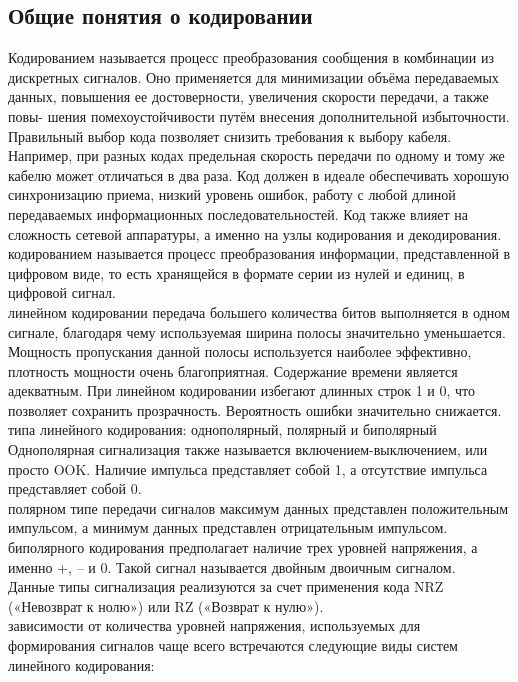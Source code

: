 \documentclass[a4paper14pt]{article}
\begin{document}
\subsection{Общие понятия о кодировании}
Кодированием называется процесс преобразования сообщения в комбинации из дискретных сигналов. Оно применяется для минимизации объёма передаваемых данных, повышения ее достоверности, увеличения скорости передачи, а также повы- шения помехоустойчивости путём внесения дополнительной избыточности. Правильный выбор кода позволяет снизить требования к выбору кабеля. Например, при разных кодах предельная скорость передачи по одному и тому же кабелю может отличаться в два раза. Код должен в идеале обеспечивать хорошую синхронизацию приема, низкий уровень ошибок, работу с любой длиной передаваемых информационных последовательностей. Код также влияет на сложность сетевой аппаратуры, а именно на узлы кодирования и декодирования.\\ 
 кодированием называется процесс преобразования информации, представленной в цифровом виде, то есть хранящейся в формате серии из нулей и единиц, в цифровой сигнал.\\
 линейном кодировании передача большего количества битов выполняется в одном сигнале, благодаря чему используемая ширина полосы значительно уменьшается. Мощность пропускания данной полосы используется наиболее эффективно, плотность мощности очень благоприятная. Содержание времени является адекватным. При линейном кодировании избегают длинных строк 1 и 0, что позволяет сохранить прозрачность. Вероятность ошибки значительно снижается.\\
 типа линейного кодирования: однополярный, полярный и биполярный 
Однополярная сигнализация также называется включением-выключением, или просто OOK. Наличие импульса представляет собой 1, а отсутствие импульса представляет собой 0.\\
 полярном типе передачи сигналов максимум данных представлен положительным импульсом, а минимум данных представлен отрицательным импульсом.\\
 биполярного кодирования предполагает наличие трех уровней напряжения, а именно +, – и 0. Такой сигнал называется двойным двоичным сигналом.\\
Данные типы сигнализация реализуются за счет применения кода NRZ («Невозврат к нолю») или RZ («Возврат к нулю»).\\
 зависимости от количества уровней напряжения, используемых для формирования сигналов чаще всего встречаются следующие виды систем линейного кодирования:\\
\end{document}
